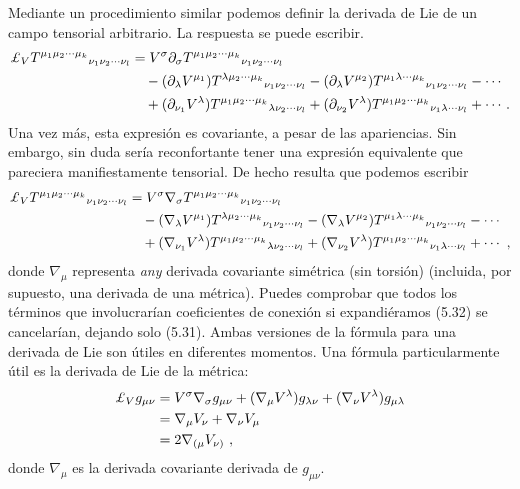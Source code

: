 \documentclass[11pt,b5paper,openany,twoside]{book}
\newcommand{\mn}{{\mu\nu}}
\newcommand{\p}[1]{{\partial_{#1}}}
\def\lie{\pounds}
\begin{document}
Mediante un procedimiento similar podemos definir la derivada de Lie de un campo tensorial arbitrario.
La respuesta se puede escribir.
\begin{align}
\lie_V T^{\mu_1 \mu_2 \cdots \mu_k}{}_{\nu_1
\nu_2 \cdots \nu_l}  &=  V^\sigma\partial_\sigma T^{\mu_1 \mu_2 \cdots
\mu_k}{}_{\nu_1 \nu_2 \cdots \nu_l}  \notag \\
& \quad -(\p\lambda V^{\mu_1}) T^{\lambda \mu_2 \cdots
\mu_k}{}_{\nu_1 \nu_2 \cdots \nu_l}
-(\p\lambda V^{\mu_2}) T^{\mu_1 \lambda \cdots
\mu_k}{}_{\nu_1 \nu_2 \cdots \nu_l} -\cdots \notag \\
&\quad +(\p{\nu_1}V^\lambda)T^{\mu_1 \mu_2 \cdots
\mu_k}{}_{\lambda \nu_2 \cdots \nu_l}
+(\p{\nu_2}V^\lambda)T^{\mu_1 \mu_2 \cdots \mu_k}{}_{\nu_1
\lambda \cdots \nu_l} + \cdots \,.\label{5.31}
\end{align}
Una vez más, esta expresión es covariante, a pesar de las apariencias.
Sin embargo, sin duda sería reconfortante tener una expresión equivalente que pareciera manifiestamente tensorial.
De hecho resulta que podemos escribir
\begin{align}
\lie_V T^{\mu_1 \mu_2 \cdots \mu_k}{}_{\nu_1
\nu_2 \cdots \nu_l}  &=  V^\sigma\nabla_\sigma T^{\mu_1 \mu_2 \cdots
\mu_k}{}_{\nu_1 \nu_2 \cdots \nu_l}  \notag \\
& \quad -(\nabla_\lambda V^{\mu_1}) T^{\lambda \mu_2 \cdots
\mu_k}{}_{\nu_1 \nu_2 \cdots \nu_l}
-(\nabla_\lambda V^{\mu_2}) T^{\mu_1 \lambda \cdots
\mu_k}{}_{\nu_1 \nu_2 \cdots \nu_l} -\cdots \notag \\
&\quad +(\nabla_{\nu_1}V^\lambda)T^{\mu_1 \mu_2 \cdots
\mu_k}{}_{\lambda \nu_2 \cdots \nu_l}
+(\nabla_{\nu_2}V^\lambda)T^{\mu_1 \mu_2 \cdots \mu_k}{}_{\nu_1
\lambda \cdots \nu_l} + \cdots \ ,\label{5.32}
\end{align}
donde $\nabla_\mu$ representa {\it any} derivada covariante simétrica (sin torsión) (incluida, por supuesto, una derivada de una métrica).
Puedes comprobar que todos los términos que involucrarían coeficientes de conexión si expandiéramos (5.32) se cancelarían, dejando solo (5.31).
Ambas versiones de la fórmula para una derivada de Lie son útiles en diferentes momentos.
Una fórmula particularmente útil es la derivada de Lie de la métrica:
\begin{align}
\lie_V g_\mn  &=  V^\sigma\nabla_\sigma g_\mn
+(\nabla_{\mu}V^\lambda)g_{\lambda\nu} +(\nabla_{\nu}V^\lambda)
g_{\mu\lambda} \notag \\
&=  \nabla_\mu V_\nu + \nabla_\nu V_\mu \notag \\
&=  2\nabla_{(\mu} V_{\nu)}\ ,\label{5.33}
\end{align}
donde $\nabla_\mu$ es la derivada covariante derivada de $g_\mn$.
\end{document}
